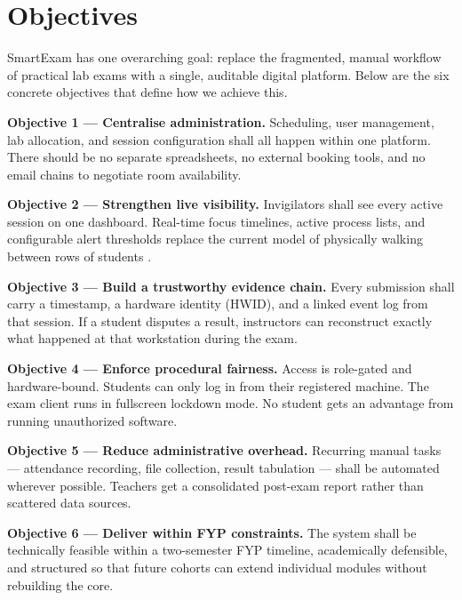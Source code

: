 \section{Objectives}

SmartExam has one overarching goal: replace the fragmented, manual workflow of practical lab exams with a single, auditable digital platform. Below are the six concrete objectives that define how we achieve this.

\textbf{Objective 1 — Centralise administration.} Scheduling, user management, lab allocation, and session configuration shall all happen within one platform. There should be no separate spreadsheets, no external booking tools, and no email chains to negotiate room availability.

\textbf{Objective 2 — Strengthen live visibility.} Invigilators shall see every active session on one dashboard. Real-time focus timelines, active process lists, and configurable alert thresholds replace the current model of physically walking between rows of students \cite{rbac1}.

\textbf{Objective 3 — Build a trustworthy evidence chain.} Every submission shall carry a timestamp, a hardware identity (HWID), and a linked event log from that session. If a student disputes a result, instructors can reconstruct exactly what happened at that workstation during the exam.

\textbf{Objective 4 — Enforce procedural fairness.} Access is role-gated and hardware-bound. Students can only log in from their registered machine. The exam client runs in fullscreen lockdown mode. No student gets an advantage from running unauthorized software.

\textbf{Objective 5 — Reduce administrative overhead.} Recurring manual tasks — attendance recording, file collection, result tabulation — shall be automated wherever possible. Teachers get a consolidated post-exam report rather than scattered data sources.

\textbf{Objective 6 — Deliver within FYP constraints.} The system shall be technically feasible within a two-semester FYP timeline, academically defensible, and structured so that future cohorts can extend individual modules without rebuilding the core.
